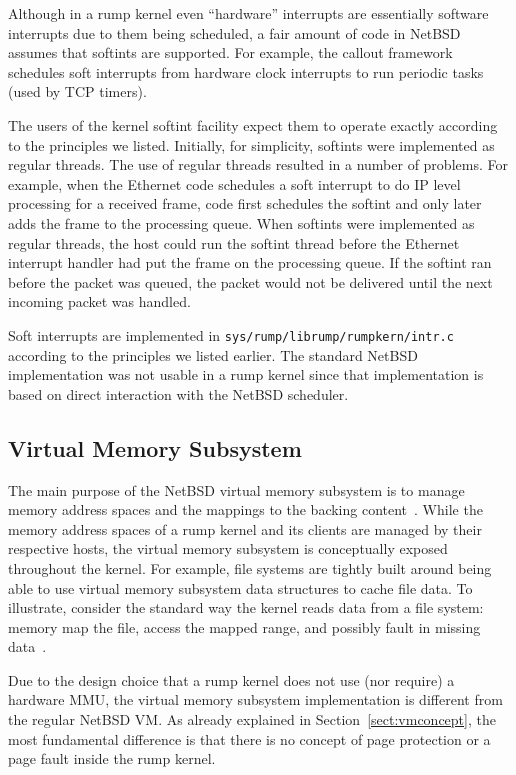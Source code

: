Although in a rump kernel even ``hardware'' interrupts are essentially
software interrupts due to them being scheduled, a fair amount of
code in NetBSD assumes that softints are supported.  For example,
the callout framework~\cite{costello:callout} schedules soft
interrupts from hardware clock interrupts to run periodic tasks
(used \eg by TCP timers).

The users of the kernel softint facility expect them to operate exactly
according to the principles we listed.  Initially, for simplicity,
softints were implemented as regular threads.  The use of regular threads
resulted in a number of problems.  For example, when the Ethernet code
schedules a soft interrupt to do IP level processing for a received frame,
code first schedules the softint and only later adds the frame to the
processing queue.  When softints were implemented as regular threads, the
host could run the softint thread before the Ethernet interrupt handler
had put the frame on the processing queue.  If the softint ran before the
packet was queued, the packet would not be delivered until the next
incoming packet was handled.

Soft interrupts are implemented in
\texttt{sys/rump/librump/rumpkern/intr.c} according to the principles
we listed earlier.  The standard NetBSD implementation was not
usable in a rump kernel since that implementation is based on direct
interaction with the NetBSD scheduler.


\subsection{Virtual Memory Subsystem}

The main purpose of the NetBSD virtual memory subsystem is to manage
memory address spaces and the mappings to the backing
content~\cite{cranor:uvm}.  While the memory address spaces of a
rump kernel and its clients are managed by their respective hosts,
the virtual memory subsystem is conceptually exposed throughout
the kernel.  For example, file systems are tightly built around
being able to use virtual memory subsystem data structures to cache
file data.  To illustrate, consider the standard way the kernel reads
data from a file system: memory map the file, access the mapped range,
and possibly fault in missing data~\cite{silvers:ubc}.

Due to the design choice that a rump kernel does not use (nor
require) a hardware MMU, the virtual memory subsystem implementation
is different from the regular NetBSD VM.  As already
explained in Section~\ref{sect:vmconcept}, the most fundamental
difference is that there is no concept of page protection or a
page fault inside the rump kernel.

